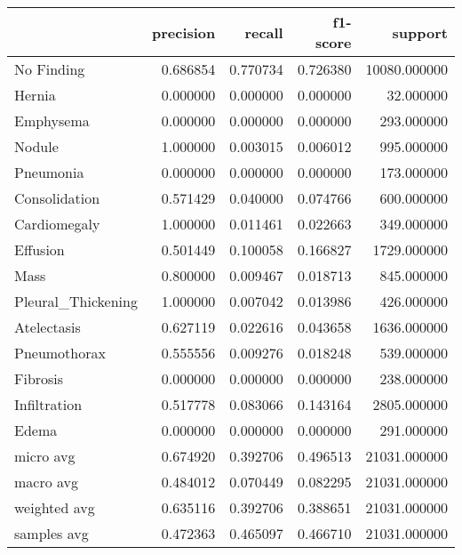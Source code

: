 \begin{tabular}{lrrrr}
\toprule
 & precision & recall & f1-score & support \\
\midrule
No Finding & 0.686854 & 0.770734 & 0.726380 & 10080.000000 \\
Hernia & 0.000000 & 0.000000 & 0.000000 & 32.000000 \\
Emphysema & 0.000000 & 0.000000 & 0.000000 & 293.000000 \\
Nodule & 1.000000 & 0.003015 & 0.006012 & 995.000000 \\
Pneumonia & 0.000000 & 0.000000 & 0.000000 & 173.000000 \\
Consolidation & 0.571429 & 0.040000 & 0.074766 & 600.000000 \\
Cardiomegaly & 1.000000 & 0.011461 & 0.022663 & 349.000000 \\
Effusion & 0.501449 & 0.100058 & 0.166827 & 1729.000000 \\
Mass & 0.800000 & 0.009467 & 0.018713 & 845.000000 \\
Pleural_Thickening & 1.000000 & 0.007042 & 0.013986 & 426.000000 \\
Atelectasis & 0.627119 & 0.022616 & 0.043658 & 1636.000000 \\
Pneumothorax & 0.555556 & 0.009276 & 0.018248 & 539.000000 \\
Fibrosis & 0.000000 & 0.000000 & 0.000000 & 238.000000 \\
Infiltration & 0.517778 & 0.083066 & 0.143164 & 2805.000000 \\
Edema & 0.000000 & 0.000000 & 0.000000 & 291.000000 \\
micro avg & 0.674920 & 0.392706 & 0.496513 & 21031.000000 \\
macro avg & 0.484012 & 0.070449 & 0.082295 & 21031.000000 \\
weighted avg & 0.635116 & 0.392706 & 0.388651 & 21031.000000 \\
samples avg & 0.472363 & 0.465097 & 0.466710 & 21031.000000 \\
\bottomrule
\end{tabular}
